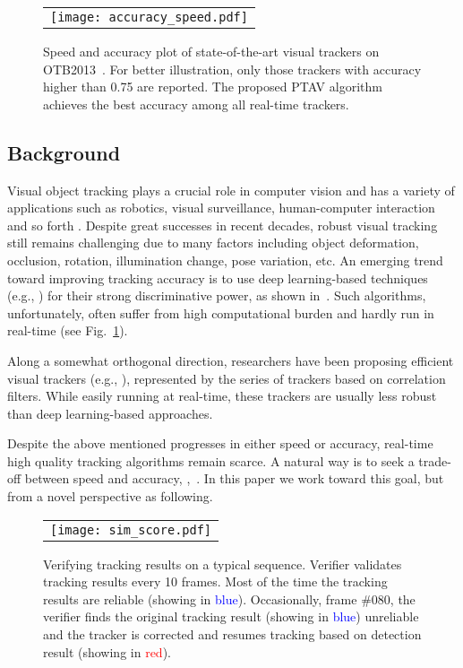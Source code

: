 \documentclass[10pt,twocolumn,letterpaper]{article}
\begin{document}
\begin{figure}[!t]
\centering
\begin{tabular}{@{}C{8.1cm}@{}}
\texttt{[image: accuracy\_speed.pdf]}\\
\end{tabular}
\caption{Speed and accuracy plot of state-of-the-art visual trackers on OTB2013~\cite{wu2013online}. For better illustration, only those trackers with accuracy higher than 0.75 are reported. The proposed PTAV algorithm achieves the best accuracy among all real-time trackers.}
\label{fig:speed-accuracy}
\end{figure}

\subsection{Background}

Visual object tracking plays a crucial role in computer vision and has a variety of applications such as robotics, visual surveillance, human-computer interaction and so forth \cite{smeulders2014visual,YilmazJS06survey}. Despite great successes in recent decades, robust visual tracking still remains challenging due to many factors including object deformation, occlusion, rotation, illumination change, pose variation, etc. An emerging trend toward improving tracking accuracy is to use deep learning-based techniques (e.g., \cite{ma2015hierarchical,nam2016learning,fan2016sanet,wang2013learning}) for their strong discriminative power, as shown in~\cite{nam2016learning}. Such algorithms, unfortunately, often suffer from high computational burden and hardly run in real-time (see Fig.~\ref{fig:speed-accuracy}).

Along a somewhat orthogonal direction, researchers have been proposing efficient visual trackers (e.g., \cite{henriques2015high,zhang2012real,danelljan2016discriminative,bolme2010visual}), represented by the series of trackers based on correlation filters. While easily running at real-time, these trackers are usually less robust than deep learning-based approaches.

Despite the above mentioned progresses in either speed or accuracy, real-time high quality tracking algorithms remain scarce. A natural way is to seek a trade-off between speed and accuracy, {\eg,~\cite{bertinetto2016staple,ma2015long}}. In this paper we work toward this goal, but from a novel perspective as following.

\begin{figure*}[!t]
\centering
\begin{tabular}{@{}C{17.1cm}@{}}
\texttt{[image: sim\_score.pdf]}\\
\end{tabular}
\caption{Verifying tracking results on a typical sequence. Verifier validates tracking results every 10 frames. Most of the time the tracking results are reliable (showing in \textcolor{blue}{blue}). Occasionally, \eg frame \#080, the verifier finds the original tracking result (showing in \textcolor{blue}{blue}) unreliable and the tracker is corrected and resumes tracking based on detection result (showing in \textcolor{red}{red}).}
\label{fig:10frames}
\end{figure*}
\end{document}
